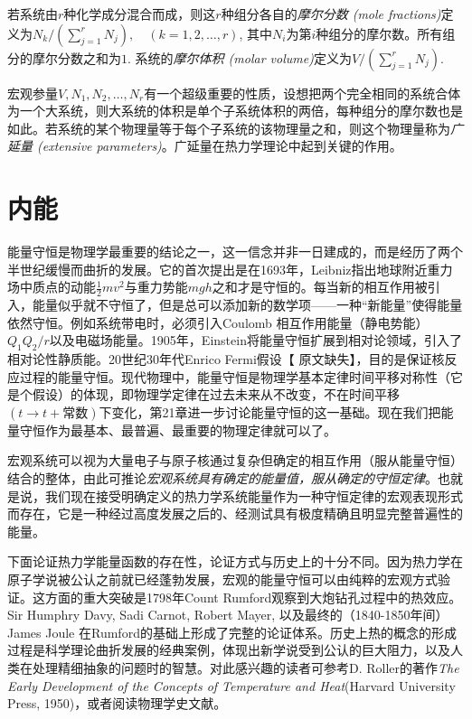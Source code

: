 若系统由$r$种化学成分混合而成，则这$r$种组分各自的{\it 摩尔分数 (mole fractions)}定义为$N_k / (\sum_{j = 1}^r N_j), \quad (k = 1, 2, \dots, r)$, 其中$N_i$为第$i$种组分的摩尔数。所有组分的摩尔分数之和为$1$. 系统的{\it 摩尔体积 (molar volume)}定义为$V / (\sum_{j = 1}^r N_j)$.

宏观参量$V, N_1, N_2, \dots, N_r$有一个超级重要的性质，设想把两个完全相同的系统合体为一个大系统，则大系统的体积是单个子系统体积的两倍，每种组分的摩尔数也是如此。若系统的某个物理量等于每个子系统的该物理量之和，则这个物理量称为{\it 广延量 (extensive parameters)}。广延量在热力学理论中起到关键的作用。

\section{内能}
\label{sec1.4}
能量守恒是物理学最重要的结论之一，这一信念并非一日建成的，而是经历了两个半世纪缓慢而曲折的发展。它的首次提出是在1693年，Leibniz指出地球附近重力场中质点的动能$\frac{1}{2} m v^2$与重力势能$mgh$之和才是守恒的。每当新的相互作用被引入，能量似乎就不守恒了，但是总可以添加新的数学项——一种“新能量”使得能量依然守恒。例如系统带电时，必须引入{Coulomb 相互作用能量}（静电势能）$Q_1 Q_2 / r$以及电磁场能量。1905年，Einstein将能量守恒扩展到相对论领域，引入了相对论性静质能。20世纪30年代Enrico Fermi假设【{\color{red} 原文缺失}】，目的是保证核反应过程的能量守恒。现代物理中，能量守恒是物理学基本定律时间平移对称性（它是个假设）的体现，即物理学定律在过去未来从不改变，不在时间平移$(t \to t + \text{常数})$下变化，第21章进一步讨论能量守恒的这一基础。现在我们把能量守恒作为最基本、最普遍、最重要的物理定律就可以了。

宏观系统可以视为大量电子与原子核通过复杂但确定的相互作用（服从能量守恒）结合的整体，由此可推论{\it 宏观系统具有确定的能量值，服从确定的守恒定律}。也就是说，我们现在接受明确定义的热力学系统能量作为一种守恒定律的宏观表现形式而存在，它是一种经过高度发展之后的、经测试具有极度精确且明显完整普遍性的能量。

下面论证热力学能量函数的存在性，论证方式与历史上的十分不同。因为热力学在原子学说被公认之前就已经蓬勃发展，宏观的能量守恒可以由纯粹的宏观方式验证。这方面的重大突破是1798年Count Rumford观察到大炮钻孔过程中的热效应。Sir Humphry Davy, Sadi Carnot, Robert Mayer, 以及最终的（1840-1850年间）James Joule 在Rumford的基础上形成了完整的论证体系。历史上热的概念的形成过程是科学理论曲折发展的经典案例，体现出新学说受到公认的巨大阻力，以及人类在处理精细抽象的问题时的智慧。对此感兴趣的读者可参考D. Roller的著作{\it The Early Development of the Concepts of Temperature and Heat}(Harvard University Press, 1950)，或者阅读物理学史文献。


